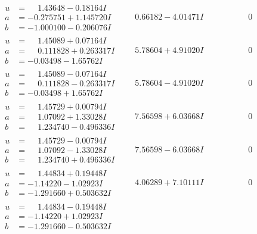 \documentclass[1p]{elsarticle_modified}
\theoremstyle{definition}
\begin{document}
$$\begin{array}{c|c|c}
\begin{aligned}
u &= \phantom{-}1.43648 - 0.18164 I \\
a &= -0.275751 + 1.145720 I \\
b &= -1.000100 - 0.206076 I\end{aligned}
 & \phantom{-}0.66182 - 4.01471 I & \phantom{-0.000000 } 0 \\ \hline\begin{aligned}
u &= \phantom{-}1.45089 + 0.07164 I \\
a &= \phantom{-}0.111828 + 0.263317 I \\
b &= -0.03498 - 1.65762 I\end{aligned}
 & \phantom{-}5.78604 + 4.91020 I & \phantom{-0.000000 } 0 \\ \hline\begin{aligned}
u &= \phantom{-}1.45089 - 0.07164 I \\
a &= \phantom{-}0.111828 - 0.263317 I \\
b &= -0.03498 + 1.65762 I\end{aligned}
 & \phantom{-}5.78604 - 4.91020 I & \phantom{-0.000000 } 0 \\ \hline\begin{aligned}
u &= \phantom{-}1.45729 + 0.00794 I \\
a &= \phantom{-}1.07092 + 1.33028 I \\
b &= \phantom{-}1.234740 - 0.496336 I\end{aligned}
 & \phantom{-}7.56598 + 6.03668 I & \phantom{-0.000000 } 0 \\ \hline\begin{aligned}
u &= \phantom{-}1.45729 - 0.00794 I \\
a &= \phantom{-}1.07092 - 1.33028 I \\
b &= \phantom{-}1.234740 + 0.496336 I\end{aligned}
 & \phantom{-}7.56598 - 6.03668 I & \phantom{-0.000000 } 0 \\ \hline\begin{aligned}
u &= \phantom{-}1.44834 + 0.19448 I \\
a &= -1.14220 - 1.02923 I \\
b &= -1.291660 + 0.503632 I\end{aligned}
 & \phantom{-}4.06289 + 7.10111 I & \phantom{-0.000000 } 0 \\ \hline\begin{aligned}
u &= \phantom{-}1.44834 - 0.19448 I \\
a &= -1.14220 + 1.02923 I \\
b &= -1.291660 - 0.503632 I\end{aligned}

\end{array}$$
\end{document}

